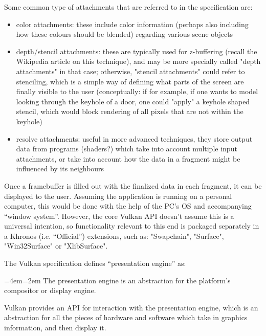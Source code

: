\documentclass[12pt,letterpaper]{article}
\newcommand{\inquotes}[1]{``#1''}	%
\newenvironment{indenttext}{%
	\par%
	\medskip
	\leftskip=4em\rightskip=2em%
	\noindent\ignorespaces}{%
	\par\medskip}
\renewenvironment{quotation}{\begin{indenttext}\fontfamily{LinuxLibertineT-OsF}\selectfont}{\end{indenttext}}
\begin{document}
    Some common type of attachments that are referred to in the specification are:
        \begin{itemize}
            \item color attachments: these include color information (perhaps also including how these colours should be blended) regarding various scene objects
            
            \item depth/stencil attachments: these are typically used for z-buffering (recall the Wikipedia article on this technique), and may be more specially called "depth attachments" in that case; otherwise, "stencil attachments" could refer to stenciling, which is a simple way of defining what parts of the screen are finally visible to the user (conceptually: if for example, if one wants to model looking through the keyhole of a door, one could "apply" a keyhole shaped stencil, which would block rendering of all pixels that are not within the keyhole)
            
            \item resolve attachments: useful in more advanced techniques, they store output data from programs (shaders?) which take into account multiple input attachments, or take into account how the data in a fragment might be influenced by its neighbours
        \end{itemize}
    
    Once a framebuffer is filled out with the finalized data in each fragment, it can be displayed to the user. Assuming the application is running on a personal computer, this would be done with the help of the PC's OS and accompanying \inquotes{window system}. However, the core Vulkan API doesn't assume this is a universal intention, so functionality relevant to this end is packaged separately in a Khronos (i.e. \inquotes{Official}) extensions, such as: "Swapchain", "Surface", "Win32Surface" or "XlibSurface". 

    The Vulkan specification defines \inquotes{presentation engine} as:
        \begin{quotation}
            The presentation engine is an abstraction for the platform’s compositor or display engine.
        \end{quotation}
    Vulkan provides an API for interaction with the presentation engine, which is an abstraction for all the pieces of hardware and software which take in graphics information, and then display it. 
\end{document}
